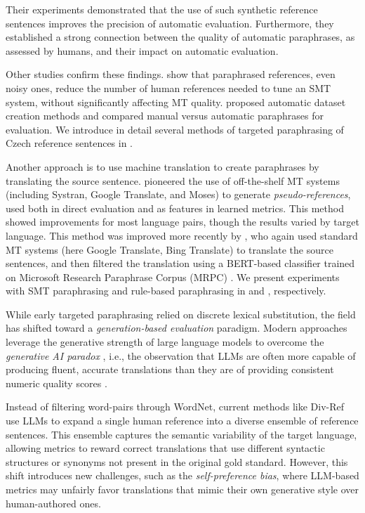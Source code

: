 Their experiments demonstrated that the use of such synthetic reference sentences improves the precision of automatic evaluation. Furthermore, they established a strong connection between the quality of automatic paraphrases, as assessed by humans, and their impact on automatic evaluation. %

Other studies confirm these findings. \cite{madnani-etal-2007-using} show that paraphrased references, even noisy ones, reduce the number of human references needed to tune an SMT system, without significantly affecting MT quality. \cite{tamchyna-barancikova-2016-manual} proposed automatic dataset creation methods and compared manual versus automatic paraphrases for evaluation. We introduce in detail several methods of targeted paraphrasing of Czech reference sentences in .

Another approach is to use machine translation to create paraphrases by translating the source sentence. \cite{albrecht_2008} pioneered the use of off-the-shelf MT systems (including Systran, Google Translate, and Moses) to generate \textit{pseudo-references}, used both in direct evaluation and as features in learned metrics. This method showed improvements for most language pairs, though the results varied by target language. This method was improved more recently by \cite{yoshimura_2019a}, who again used standard MT systems (here Google Translate, Bing Translate) to translate the source sentences, and then filtered the translation using a BERT-based classifier trained on Microsoft Research Paraphrase Corpus (MRPC) \citep{dolan_2005}. We present experiments with SMT paraphrasing and rule-based paraphrasing in  and , respectively.

While early targeted paraphrasing relied on discrete lexical substitution, the field has shifted toward a \textit{generation-based evaluation} paradigm. Modern approaches leverage the generative strength of large language models to overcome the \textit{generative AI paradox} \citep{west2023generativeaiparadoxwhat}, i.e., the observation that LLMs are often more capable of producing fluent, accurate translations than they are of providing consistent numeric quality scores \citep{cui2025llmsscorersrethinkingmt}. 

Instead of filtering word-pairs through WordNet, current methods like Div-Ref \citep{tang2024metricsguiltyimprovingnlg} use LLMs to expand a single human reference into a diverse ensemble of reference sentences. This ensemble captures the semantic variability of the target language, allowing metrics to reward correct translations that use different syntactic structures or synonyms not present in the original gold standard. However, this shift introduces new challenges, such as the \textit{self-preference bias}, where LLM-based metrics may unfairly favor translations that mimic their own generative style over human-authored ones.

